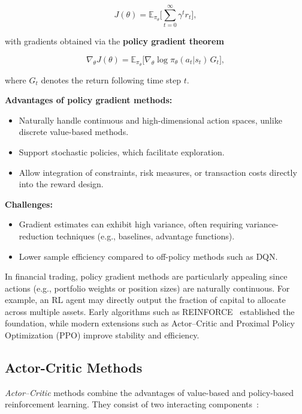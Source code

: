 \documentclass[12pt,a4paper]{report}
\begin{document}
\[
J(\theta) = \mathbb{E}_{\pi_\theta}\bigg[ \sum_{t=0}^\infty \gamma^t r_t \bigg],
\]

with gradients obtained via the \textbf{policy gradient theorem}~\cite{sutton1999policy}

\[
\nabla_\theta J(\theta) = \mathbb{E}_{\pi_\theta}\big[ \nabla_\theta \log \pi_\theta(a_t|s_t) \, G_t \big],
\]

where $G_t$ denotes the return following time step $t$.

\bigskip

\textbf{Advantages of policy gradient methods:}
\begin{itemize}
    \item Naturally handle continuous and high-dimensional action spaces, unlike discrete value-based methods.
    \item Support stochastic policies, which facilitate exploration.
    \item Allow integration of constraints, risk measures, or transaction costs directly into the reward design.
\end{itemize}

\textbf{Challenges:}
\begin{itemize}
    \item Gradient estimates can exhibit high variance, often requiring variance-reduction techniques (e.g., baselines, advantage functions).
    \item Lower sample efficiency compared to off-policy methods such as DQN.
\end{itemize}

\bigskip

In financial trading, policy gradient methods are particularly appealing since actions (e.g., portfolio weights or position sizes) are naturally continuous. For example, an RL agent may directly output the fraction of capital to allocate across multiple assets. Early algorithms such as REINFORCE~\cite{williams1992simple} established the foundation, while modern extensions such as Actor–Critic and Proximal Policy Optimization (PPO) improve stability and efficiency.

\subsection{Actor-Critic Methods}

\textit{Actor–Critic} methods combine the advantages of value-based and policy-based reinforcement learning. They consist of two interacting components~\cite{konda2000actor}:
\end{document}
